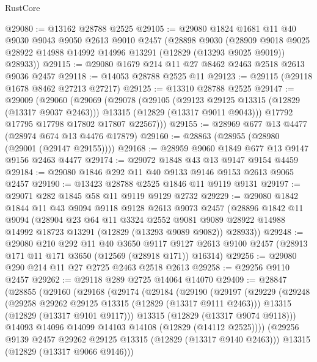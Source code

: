 \begin{lexlean}{RustCore}
\begin{coremodule}
@29080 := @13162 @28788 @2525
@29105 := @29080
    @1824
    @1681
    @11
    @40
    @9030
    @9043
    @9050
    @2613
    @9010
    @2457
    (@28898
      @9030
      (@28909 @9018 @9025 @28922 @14988 @14992 @14996 @13291 (@12829 (@13293 @9025 @9019)) @28933))
@29115 := @29080 @1679 @214 @11 @27 @8462 @2463 @2518 @2613 @9036 @2457
@29118 := @14053 @28788 @2525 @11
@29123 := @29115 (@29118 @1678 @8462 @27213 @27217)
@29125 := @13310 @28788 @2525
@29147 := @29009
    (@29060
      (@29069
        (@29078
          (@29105
            (@29123 @29125 @13315 (@12829 (@13317 @9037 @2463)))
            @13315
            (@12829 (@13317 @9011 @9043)))
          @17792
          @17795
          @17798
          @17802
          @17807
          @22567)))
@29155 := @28969 @677 @13 @4477 (@28974 @674 @13 @4476 @17879)
@29160 := @28863 (@28955 (@28980 (@29001 (@29147 @29155))))
@29168 := @28959 @9060 @1849 @677 @13 @9147 @9156 @2463 @4477
@29174 := @29072 @1848 @43 @13 @9147 @9154 @4459
@29184 := @29080 @1846 @292 @11 @40 @9133 @9146 @9153 @2613 @9065 @2457
@29190 := @13423 @28788 @2525 @1846 @11 @9119 @9131
@29197 := @29071 @282 @1845 @58 @11 @9119 @9129 @2732
@29229 := @29080
    @1842
    @1844
    @11
    @43
    @9094
    @9118
    @9128
    @2613
    @9073
    @2457
    (@28896
      @1842
      @11
      @9094
      (@28904
        @23
        @64
        @11
        @3324
        @2552
        @9081
        @9089
        @28922
        @14988
        @14992
        @18723
        @13291
        (@12829 (@13293 @9089 @9082))
        @28933))
@29248 := @29080
    @210
    @292
    @11
    @40
    @3650
    @9117
    @9127
    @2613
    @9100
    @2457
    (@28913 @171 @11 @171 @3650 (@12569 (@28918 @171)) @16314)
@29256 := @29080 @290 @214 @11 @27 @2725 @2463 @2518 @2613
@29258 := @29256 @9110 @2457
@29262 := @29118 @289 @2725 @14064 @14070
@29409 := @28847
    (@28855
      (@29160
        (@29168
          (@29174
            (@29184
              (@29190
                (@29197
                  (@29229
                    (@29248
                      (@29258 @29262 @29125 @13315 (@12829 (@13317 @9111 @2463)))
                      @13315
                      (@12829 (@13317 @9101 @9117)))
                    @13315
                    (@12829 (@13317 @9074 @9118)))
                  @14093
                  @14096
                  @14099
                  @14103
                  @14108
                  (@12829 (@14112 @2525))))
              (@29256 @9139 @2457 @29262 @29125 @13315 (@12829 (@13317 @9140 @2463)))
              @13315
              (@12829 (@13317 @9066 @9146)))

\end{coremodule}
\end{lexlean}

